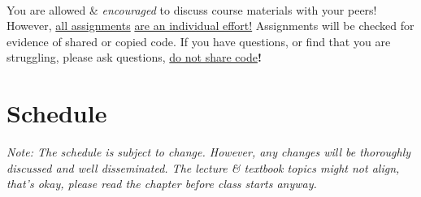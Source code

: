 \documentclass[letter,11pt]{article}
\begin{document}
\paragraph{}You are allowed \& \textit{encouraged} to discuss course materials with your peers! However, \underline{all assignments} \underline{are an individual effort!} Assignments will be checked for evidence of shared or copied code. If you have questions, or find that you are struggling, please ask questions, \underline{do not share code}\textbf{!}

\section*{Schedule}
\textit{Note: The schedule is subject to change. However, any changes will be thoroughly discussed and well disseminated. The lecture \& textbook topics might not align, that's okay, please read the chapter before class starts anyway.}
\end{document}
